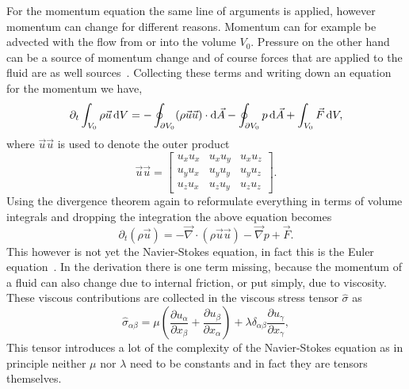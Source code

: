 For the momentum equation the same line of arguments is applied, however momentum can change for different reasons.
Momentum can for example be advected with the flow from or into the volume $V_0$.
Pressure on the other hand can be a source of momentum change and of course forces that are applied to the fluid are as well sources~\cite{krugerLatticeBoltzmannMethod2017}.
Collecting these terms and writing down an equation for the momentum we have,
\begin{equation}\label{eq:navier_stokes_1}
    \partial_t \int_{V_0}\rho\vec{u}\mathop{}\!\mathrm{d} V = -\oint_{\partial V_0}(\rho\vec{u}\vec{u})\cdot\mathop{}\!\mathrm{d}\vec{A} - \oint_{\partial V_0} p\mathop{}\!\mathrm{d}\vec{A} + \int_{V_0} \vec{F}\mathop{}\!\mathrm{d} V, 
\end{equation}
where $\vec{u}\vec{u}$ is used to denote the outer product
\begin{equation}
    \vec{u}\vec{u} = \begin{bmatrix}
    u_x u_x & u_x u_y & u_x u_z \\
    u_y u_x & u_y u_y & u_y u_z \\
    u_z u_x & u_z u_y & u_z u_z
    \end{bmatrix} .
\end{equation}
Using the divergence theorem again to reformulate everything in terms of volume integrals and dropping the integration the above equation becomes
\begin{equation}\label{eq:navier_stokes_2}
    \partial_t(\rho\vec{u}) = -\vec{\nabla}\cdot(\rho\vec{u}\vec{u}) - \vec{\nabla} p + \vec{F}.
\end{equation}
This however is not yet the Navier-Stokes equation, in fact this is the Euler equation~\cite{batchelorIntroductionFluidDynamics1967}.
In the derivation there is one term missing, because the momentum of a fluid can also change due to internal friction, or put simply, due to viscosity.
These viscous contributions are collected in the viscous stress tensor $\hat{\sigma}$ as
\begin{equation}\label{eq:stress_tens}
    \hat{\sigma}_{\alpha\beta} = \mu\left(\frac{\partial u_{\alpha}}{\partial x_{\beta}} + \frac{\partial u_{\beta}}{\partial x_{\alpha}}\right) + \lambda\delta_{\alpha\beta}\frac{\partial u_{\gamma}}{\partial x_{\gamma}},
\end{equation}
This tensor introduces a lot of the complexity of the Navier-Stokes equation as in principle neither $\mu$ nor $\lambda$ need to be constants and in fact they are tensors themselves.


